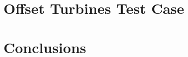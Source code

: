 
\section{Offset Turbines Test Case} \label{section6-7}


\section{Conclusions} \label{section6-8}

